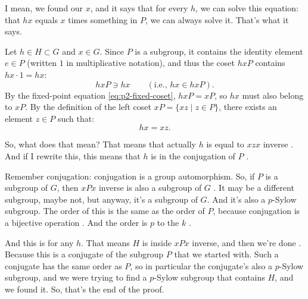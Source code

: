 \begin{proofWrapper}
\begin{speech}[00:30:35 - 00:32:09]
I mean, we found our $x$, and it says that for every $h$, we can solve this equation: that $h x$ equals $x$ times something in $P$, we can always solve it. That's what it says.
\end{speech}

\begin{content}[Coset Membership and the Equation \texorpdfstring{$h x = x z$}{h x = x z}]
Let $h \in H \subset G$ and $x \in G$. Since $P$ is a subgroup, it contains the identity element $e \in P$ (written $1$ in multiplicative notation), and thus the coset $h x P$ contains $h x \cdot 1 = h x$:
\[
h x P \ni h x \qquad (\text{i.e., } h x \in h x P).
\]
By the fixed-point equation \eqref{eq:p2-fixed-coset}, $h x P = x P$, so $h x$ must also belong to $x P$. By the definition of the left coset $x P = \{ x z \mid z \in P \}$, there exists an element $z \in P$ such that:
\begin{equation}\label{eq:p3-hx-xz}
h x = x z.
\end{equation}
\end{content}

\begin{hidden}
\end{hidden}

\begin{speech}[00:32:09 - 00:33:27]
So, what does that mean? That means that actually $h$ is equal to $x z x$ inverse . And if I rewrite this, this means that $h$ is in the conjugation of $P$ .

Remember conjugation: conjugation is a group automorphism. So, if $P$ is a subgroup of $G$, then $x P x$ inverse is also a subgroup of $G$ . It may be a different subgroup, maybe not, but anyway, it's a subgroup of $G$. And it's also a $p$-Sylow subgroup. The order of this is the same as the order of $P$, because conjugation is a bijective operation . And the order is $p$ to the $k$ .

And this is for any $h$. That means $H$ is inside $x P x$ inverse, and then we're done . Because this is a conjugate of the subgroup $P$ that we started with. Such a conjugate has the same order as $P$, so in particular the conjugate's also a $p$-Sylow subgroup, and we were trying to find a $p$-Sylow subgroup that contains $H$, and we found it. So, that's the end of the proof.
\end{speech}


\end{proofWrapper}
